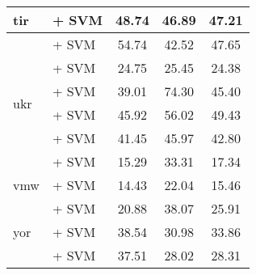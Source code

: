 \begin{sidewaystable}[h]
{\begin{tabular}{llccc}
            \midrule
            tir                                & \citep{wang2024multilingual} + SVM                                 & 48.74                                & 46.89              & 47.21             \\
            \midrule
            \multirow{6}{*}{ukr}               & \citep{wang2024multilingual} + SVM                                 & 54.74                                & 42.52              & 47.65             \\
                                               & \citep{schweter2020electraukrainian} + SVM                         & 24.75                                & 25.45              & 24.38             \\
                                               & \citep{snegirev2025russianfocusedembeddersexplorationrumteb} + SVM & 39.01                                & 74.30              & 45.40             \\
                                               & \citep{sturua2024jinaembeddingsv3multilingualembeddingstask} + SVM & 45.92                                & 56.02              & 49.43             \\
                                               & \citep{laba-etal-2023-contextual} + SVM                            & 41.45                                & 45.97              & 42.80             \\
                                               & \citep{minixhofer2023robertaukraine} + SVM                         & 15.29                                & 33.31              & 17.34             \\
            \midrule
            vmw                                & \citep{wang2024multilingual} + SVM                                 & 14.43                                & 22.04              & 15.46             \\
            \midrule
            \multirow{3}{*}{yor}               & \citep{feng2022languageagnosticbertsentenceembedding} + SVM        & 20.88                                & 38.07              & 25.91             \\
                                               & \citep{wang2024multilingual} + SVM                                 & 38.54                                & 30.98              & 33.86             \\
                                               & \citep{reimers2020makingmonolingualsentenceembeddings} + SVM       & 37.51                                & 28.02              & 28.31             \\




\end{tabular}}
\end{sidewaystable}
